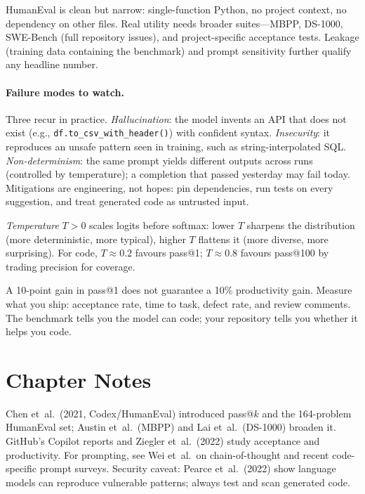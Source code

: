 HumanEval is clean but narrow: single-function Python, no project context, no dependency on other files. Real utility needs broader suites---MBPP, DS-1000, SWE-Bench (full repository issues), and project-specific acceptance tests. Leakage (training data containing the benchmark) and prompt sensitivity further qualify any headline number.

\paragraph{Failure modes to watch.} Three recur in practice. \emph{Hallucination}: the model invents an API that does not exist (e.g., \texttt{df.to\_csv\_with\_header()}) with confident syntax. \emph{Insecurity}: it reproduces an unsafe pattern seen in training, such as string-interpolated SQL. \emph{Non-determinism}: the same prompt yields different outputs across runs (controlled by temperature); a completion that passed yesterday may fail today. Mitigations are engineering, not hopes: pin dependencies, run tests on every suggestion, and treat generated code as untrusted input.

\begin{definition}[Temperature]
\emph{Temperature} $T>0$ scales logits before softmax: lower $T$ sharpens the distribution (more deterministic, more typical), higher $T$ flattens it (more diverse, more surprising). For code, $T\approx0.2$ favours pass@1; $T\approx0.8$ favours pass@100 by trading precision for coverage.
\end{definition}

\begin{remark}
A 10-point gain in pass@1 does not guarantee a 10\% productivity gain. Measure what you ship: acceptance rate, time to task, defect rate, and review comments. The benchmark tells you the model can code; your repository tells you whether it helps you code.
\end{remark}

\section{Chapter Notes}
Chen et~al.\ (2021, Codex/HumanEval) introduced pass@$k$ and the 164-problem HumanEval set; Austin et~al.\ (MBPP) and Lai et~al.\ (DS-1000) broaden it. GitHub's Copilot reports and Ziegler et~al.\ (2022) study acceptance and productivity. For prompting, see Wei et~al.\ on chain-of-thought and recent code-specific prompt surveys. Security caveat: Pearce et~al.\ (2022) show language models can reproduce vulnerable patterns; always test and scan generated code.

